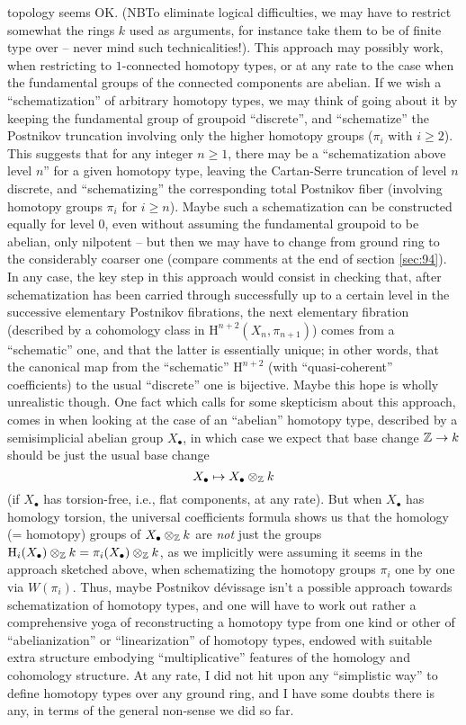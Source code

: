 topology seems OK. (NB\enspace To eliminate logical difficulties, we
may have to restrict somewhat the rings $k$ used as arguments, for
instance take them to be of finite type over \bZ{} -- never mind such
technicalities!). This approach may possibly work, when restricting to
$1$-connected homotopy types, or at any rate to the case when the
fundamental groups of the connected components are abelian. If we wish
a ``schematization'' of arbitrary homotopy types, we may think of
going about it by keeping the fundamental group of groupoid
``discrete'', and ``schematize'' the Postnikov truncation
involving only the higher homotopy groups ($\pi_i$ with $i\ge2$). This
suggests that for any integer $n\ge1$, there may be a ``schematization
above level $n$'' for a given homotopy type, leaving the Cartan-Serre
truncation of level $n$ discrete, and ``schematizing'' the
corresponding total Postnikov fiber (involving homotopy groups $\pi_i$
for $i\ge n$). Maybe such a schematization can be constructed equally
for level $0$, even without assuming the fundamental groupoid to be
abelian, only nilpotent -- but then we may have to change from ground
ring \bZ{} to the considerably coarser one \bQ{} (compare comments at
the end of section \ref{sec:94}). In any case, the key step in this
approach would consist in checking that, after schematization has been
carried through successfully up to a certain level in the successive
elementary Postnikov fibrations, the next elementary fibration
(described by a cohomology class in $\mathrm H^{n+2}(X_n,\pi_{n+1})$)
comes from a ``schematic'' one, and that the latter is essentially
unique; in other words, that the canonical map from the ``schematic''
$\mathrm H^{n+2}$ (with ``quasi-coherent'' coefficients) to the usual
``discrete'' one is bijective. Maybe this hope is wholly unrealistic
though. One fact which calls for some skepticism about this approach,
comes in when looking at the case of an ``abelian'' homotopy type,
described by a semisimplicial abelian group $X_\bullet$, in which case
we expect that base change ${\mathbb{Z}}\to k$ should be just the usual base
change
\[X_\bullet \mapsto X_\bullet \otimes_{\mathbb{Z}} k\]
(if $X_\bullet$ has torsion-free, i.e., flat components, at any
rate). But when $X_\bullet$ has homology torsion, the universal
coefficients formula shows us that the homology (= homotopy) groups of
$X_\bullet\otimes_{\mathbb{Z}} k$ are \emph{not} just the groups $\mathrm
H_i(X_\bullet) \otimes_{\mathbb{Z}} k=\pi_i(X_\bullet)\otimes_{\mathbb{Z}} k$, as we
implicitly were assuming it seems in the approach sketched above, when
schematizing the homotopy groups $\pi_i$ one by one via
$W(\pi_i)$. Thus, maybe Postnikov dévissage isn't a possible approach
towards schematization of homotopy types, and one will have to work
out rather a comprehensive yoga of reconstructing a homotopy type from
one kind or other of ``abelianization'' or ``linearization'' of
homotopy types, endowed with suitable extra structure embodying
``multiplicative'' features of the homology and cohomology
structure. At any rate, I did not hit upon any ``simplistic way'' to
define homotopy types over any ground ring, and I have some doubts
there is any, in terms of the general non-sense we did so far.

